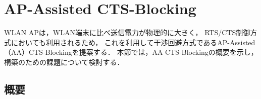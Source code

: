\documentclass[technicalreport]{ieicej}
\begin{document}






\section{AP-Assisted CTS-Blocking}
\label{sec:aa_cts}

WLAN APは，WLAN端末に比べ送信電力が物理的に大きく，
RTS/CTS制御方式においても利用されるため，
これを利用して干渉回避方式であるAP-Assisted（AA）CTS-Blockingを提案する．
本節では，AA CTS-Blockingの概要を示し，
構築のための課題について検討する．


\subsection{概要}
\label{ssec:outline}
\end{document}
